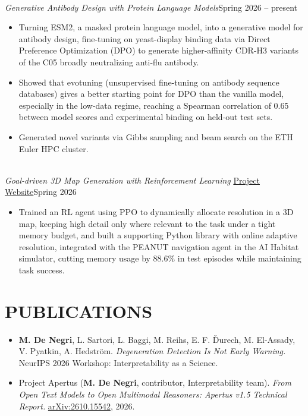 \documentclass[11pt,a4paper]{article}
\begin{document}
\vspace{2pt}
\\[-2pt]
\textit{Generative Antibody Design with Protein Language Models}\hfill Spring 2026 -- present
\begin{itemize}
  \item Turning ESM2, a masked protein language model, into a generative model for antibody design, fine-tuning on yeast-display binding data via Direct Preference Optimization (DPO) to generate higher-affinity CDR-H3 variants of the C05 broadly neutralizing anti-flu antibody.
  \item Showed that evotuning (unsupervised fine-tuning on antibody sequence databases) gives a better starting point for DPO than the vanilla model, especially in the low-data regime, reaching a Spearman correlation of 0.65 between model scores and experimental binding on held-out test sets.
  \item Generated novel variants via Gibbs sampling and beam search on the ETH Euler HPC cluster.
\end{itemize}

\vspace{2pt}
\\[-2pt]
\textit{Goal-driven 3D Map Generation with Reinforcement Learning} \textbar{} \href{https://marcodenegri.com/3dv.github.io/}{Project Website}\hfill Spring 2026
\begin{itemize}
  \item Trained an RL agent using PPO to dynamically allocate resolution in a 3D map, keeping high detail only where relevant to the task under a tight memory budget, and built a supporting Python library with online adaptive resolution, integrated with the PEANUT navigation agent in the AI Habitat simulator, cutting memory usage by 88.6\% in test episodes while maintaining task success.
\end{itemize}

\section{PUBLICATIONS}

\begin{itemize}
  \item \textbf{M. De Negri}, L. Sartori, L. Baggi, M. Reihs, E. F. \v{D}urech, M. El-Assady, V. Pyatkin, A. Hedström. \textit{Degeneration Detection Is Not Early Warning.} NeurIPS 2026 Workshop: Interpretability as a Science.
  \item Project Apertus (\textbf{M. De Negri}, contributor, Interpretability team). \textit{From Open Text Models to Open Multimodal Reasoners: Apertus v1.5 Technical Report.} \href{https://arxiv.org/abs/2610.15542}{arXiv:2610.15542}, 2026.
\end{itemize}
\end{document}
